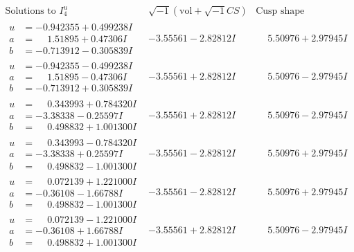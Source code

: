 \documentclass[1p]{elsarticle_modified}
\theoremstyle{definition}
\newcommand{\I}{\sqrt{-1}}
\begin{document}
$$\begin{array}{c|c|c}  
\text{Solutions to }I^u_{4}& \I (\text{vol} + \sqrt{-1}CS) & \text{Cusp shape}\\
 \hline 
\begin{aligned}
u &= -0.942355 + 0.499238 I \\
a &= \phantom{-}1.51895 + 0.47306 I \\
b &= -0.713912 - 0.305839 I\end{aligned}
 & -3.55561 - 2.82812 I & \phantom{-}5.50976 + 2.97945 I \\ \hline\begin{aligned}
u &= -0.942355 - 0.499238 I \\
a &= \phantom{-}1.51895 - 0.47306 I \\
b &= -0.713912 + 0.305839 I\end{aligned}
 & -3.55561 + 2.82812 I & \phantom{-}5.50976 - 2.97945 I \\ \hline\begin{aligned}
u &= \phantom{-}0.343993 + 0.784320 I \\
a &= -3.38338 - 0.25597 I \\
b &= \phantom{-}0.498832 + 1.001300 I\end{aligned}
 & -3.55561 + 2.82812 I & \phantom{-}5.50976 - 2.97945 I \\ \hline\begin{aligned}
u &= \phantom{-}0.343993 - 0.784320 I \\
a &= -3.38338 + 0.25597 I \\
b &= \phantom{-}0.498832 - 1.001300 I\end{aligned}
 & -3.55561 - 2.82812 I & \phantom{-}5.50976 + 2.97945 I \\ \hline\begin{aligned}
u &= \phantom{-}0.072139 + 1.221000 I \\
a &= -0.36108 - 1.66788 I \\
b &= \phantom{-}0.498832 - 1.001300 I\end{aligned}
 & -3.55561 - 2.82812 I & \phantom{-}5.50976 + 2.97945 I \\ \hline\begin{aligned}
u &= \phantom{-}0.072139 - 1.221000 I \\
a &= -0.36108 + 1.66788 I \\
b &= \phantom{-}0.498832 + 1.001300 I\end{aligned}
 & -3.55561 + 2.82812 I & \phantom{-}5.50976 - 2.97945 I \\ \hline\begin{aligned}

\end{aligned}
\end{array}$$
\end{document}
